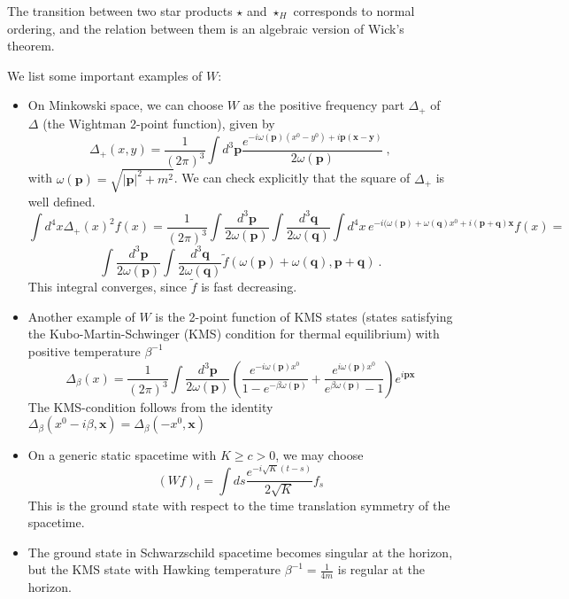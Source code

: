 \documentclass[11pt]{article}
\newcommand{\1}{\mathds{1}}                         %
\begin{document}
{{The transition between two star products $\star$ and $\star_H$ corresponds to normal ordering, and the relation between them is an algebraic version of Wick's theorem. 
\begin{exa}
We list some important examples of $W$:
\begin{itemize}
\item On Minkowski space, we can choose $W$ as the positive frequency part $\Delta_+$ of $\Delta$ (the Wightman 2-point function), given by
\[\Delta_+(x,y)=\frac{1}{(2\pi)^{3}}\int d^3\mathbf p\frac{e^{-i\omega(\mathbf p)(x^0-y^0)+i\mathbf p(\mathbf x-\mathbf y)}}{2\omega(\mathbf p)}\ ,\]
with $\omega(\mathbf p)=\sqrt{|\mathbf p|^2+m^2}$.
We can check explicitly that the square of $\Delta_+$ is well defined.
\[
\int d^4x \Delta_+(x)^2f(x)=\frac{1}{(2\pi)^{3}}\int \frac{d^3\mathbf p}{2\omega(\mathbf p)}\int \frac{d^3{\mathbf q}}{2\omega(\mathbf q)}\int d^4x\, e^{-i(\omega(\mathbf p)+\omega(\mathbf q)x^0+i(\mathbf p+\mathbf q)\mathbf x}f(x)=\]
 \[\int \frac{d^3\mathbf p}{2\omega(\mathbf p)}\int \frac{d^3{\mathbf q}}{2\omega(\mathbf q)}\tilde f(\omega(\mathbf p)+\omega(\mathbf q),\mathbf p+\mathbf q)\ .\]
This integral converges, since $\tilde f$ is fast decreasing.
\item Another example of $W$ is the 2-point function of KMS states (states satisfying the Kubo-Martin-Schwinger (KMS) condition for
thermal equilibrium) with positive temperature $\beta^{-1}$
\[
\Delta_\beta(x)=\frac{1}{(2\pi)^{3}}\int \frac{d^3\mathbf p}{2\omega(\mathbf p)}\left(\frac{e^{-i\omega(\mathbf p)x^0}}{1-e^{-\beta\omega(\mathbf p)}}+\frac{e^{i\omega(\mathbf p)x^0}}{e^{\beta\omega(\mathbf p)}-1}\right)e^{i\mathbf p\mathbf x}
\]
The KMS-condition follows from the identity $\Delta_\beta(x^0-i\beta,\mathbf x)=\Delta_\beta(-x^0,\mathbf x)$
\item On a generic static spacetime with $K\ge c>0$, we may choose
\[(Wf)_t=\int ds \frac{e^{-i\sqrt{K}(t-s)}}{2\sqrt{K}}f_s\]
This is the ground state with respect to the time translation symmetry of the spacetime. 
\item The ground state in Schwarzschild spacetime becomes singular at the horizon, but the KMS state with Hawking temperature $\beta^{-1}=\frac{1}{4m}$ is regular at the horizon.
\end{itemize}
 \end{exa}
 
}}
\end{document}
